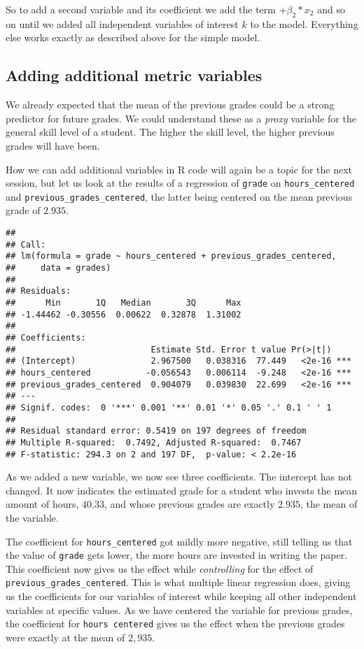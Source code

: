 \documentclass[
]{book}
\begin{document}
So to add a second variable and its coefficient we add the term \(+ \beta_2*x_2\)
and so on until we added all independent variables of interest \(k\) to the model.
Everything else works exactly as described above for the simple model.

\hypertarget{adding-additional-metric-variables}{%
\subsection{Adding additional metric variables}\label{adding-additional-metric-variables}}

We already expected that the mean of the previous grades could be a strong
predictor for future grades. We could understand these as a \emph{proxy} variable for
the general skill level of a student. The higher the skill level, the higher
previous grades will have been.

How we can add additional variables in R code will again be a topic for the next
session, but let us look at the results of a regression of \texttt{grade} on
\texttt{hours\_centered} and \texttt{previous\_grades\_centered}, the latter being centered on the
mean previous grade of \(2.935\).

\begin{verbatim}
## 
## Call:
## lm(formula = grade ~ hours_centered + previous_grades_centered, 
##     data = grades)
## 
## Residuals:
##      Min       1Q   Median       3Q      Max 
## -1.44462 -0.30556  0.00622  0.32878  1.31002 
## 
## Coefficients:
##                           Estimate Std. Error t value Pr(>|t|)    
## (Intercept)               2.967500   0.038316  77.449   <2e-16 ***
## hours_centered           -0.056543   0.006114  -9.248   <2e-16 ***
## previous_grades_centered  0.904079   0.039830  22.699   <2e-16 ***
## ---
## Signif. codes:  0 '***' 0.001 '**' 0.01 '*' 0.05 '.' 0.1 ' ' 1
## 
## Residual standard error: 0.5419 on 197 degrees of freedom
## Multiple R-squared:  0.7492, Adjusted R-squared:  0.7467 
## F-statistic: 294.3 on 2 and 197 DF,  p-value: < 2.2e-16
\end{verbatim}

As we added a new variable, we now see three coefficients.
The intercept has not changed. It now indicates the estimated grade for a
student who invests the mean amount of hours, \(40.33\), and whose previous grades
are exactly \(2.935\), the mean of the variable.

The coefficient for \texttt{hours\_centered} got mildly more negative, still telling us
that the value of \texttt{grade} gets lower, the more hours are invested in writing the
paper. This coefficient now gives us the effect while \emph{controlling} for the
effect of \texttt{previous\_grades\_centered}. This is what multiple linear regression
does, giving us the coefficients for our variables of interest while keeping all
other independent variables at specific values. As we have centered the variable
for previous grades, the coefficient for \texttt{hours\ centered} gives us the effect
when the previous grades were exactly at the mean of \(2,935\).
\end{document}
